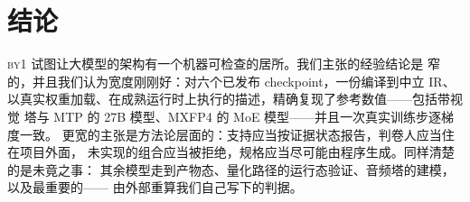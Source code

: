 \documentclass[11pt,a4paper]{ctexart}
\newcommand{\byone}{\textsc{by1}}
\begin{document}
\section{结论}

\byone{} 试图让大模型的架构有一个机器可检查的居所。我们主张的经验结论是
窄的，并且我们认为宽度刚刚好：对六个已发布 checkpoint，一份编译到中立 IR、
以真实权重加载、在成熟运行时上执行的描述，精确复现了参考数值——包括带视觉
塔与 MTP 的 27B 模型、MXFP4 的 MoE 模型——并且一次真实训练步逐梯度一致。
更宽的主张是方法论层面的：支持应当按证据状态报告，判卷人应当住在项目外面，
未实现的组合应当被拒绝，规格应当尽可能由程序生成。同样清楚的是未竟之事：
其余模型走到产物态、量化路径的运行态验证、音频塔的建模，以及最重要的——
由外部重算我们自己写下的判据。



\end{document}
